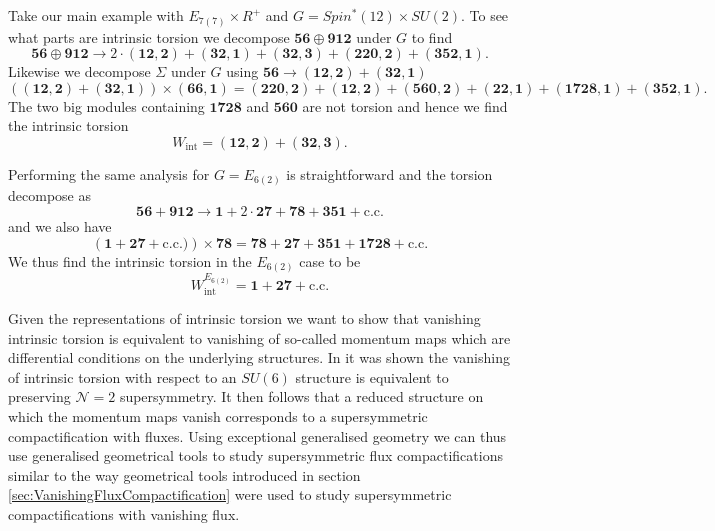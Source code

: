 Take our main example with $E_{7(7)}\times R^+$ and $G=Spin^*(12)\times SU(2)$. To see what parts are intrinsic torsion we decompose $\mathbf{56}\oplus\mathbf{912}$ under $G$ to find 
\begin{equation}
    \mathbf{56}\oplus\mathbf{912} \to 2\cdot (\mathbf{12},\mathbf{2})+(\mathbf{32},\mathbf{1})+(\mathbf{32},\mathbf{3})+(\mathbf{220},\mathbf{2})+(\mathbf{352},\mathbf{1}).
\end{equation}
Likewise we decompose $\Sigma$ under $G$ using $\mathbf{56}\to (\mathbf{12},\mathbf{2})+(\mathbf{32},\mathbf{1})$ 
\begin{equation}
    \left((\mathbf{12},\mathbf{2})+(\mathbf{32},\mathbf{1})\right)\times (\mathbf{66},\mathbf{1})=(\mathbf{220},\mathbf{2})+(\mathbf{12},\mathbf{2})+(\mathbf{560},\mathbf{2})+(\mathbf{22},\mathbf{1})+(\mathbf{1728},\mathbf{1})+(\mathbf{352},\mathbf{1}).
\end{equation}
The two big modules containing $\mathbf{1728}$ and $\mathbf{560}$ are not torsion and hence we find the intrinsic torsion 
\begin{equation}
    W_{\text{int}} = (\mathbf{12},\mathbf{2})+(\mathbf{32},\mathbf{3}).
\end{equation}

Performing the same analysis for $G=E_{6(2)}$ is straightforward and the torsion decompose as
\begin{equation}
    \mathbf{56}+\mathbf{912}\to \mathbf{1}+2\cdot\mathbf{27}+\mathbf{78}+\mathbf{351}+\text{c.c.}
\end{equation}
and we also have 
\begin{equation}
    \left(\mathbf{1}+\mathbf{27}+\text{c.c.})\right)\times \mathbf{78} = \mathbf{78}+\mathbf{27}+\mathbf{351}+\mathbf{1728}+\text{c.c.}
\end{equation}
We thus find the intrinsic torsion in the $E_{6(2)}$ case to be 
\begin{equation}
    W_{\text{int}}^{E_{6(2)}} = \textbf{1}+\mathbf{27}+\text{c.c.}
\end{equation}

Given the representations of intrinsic torsion we want to show that vanishing intrinsic torsion is equivalent to vanishing of so-called momentum maps which are differential conditions on the underlying structures. In \cite{Coimbra:2014uxa} it was shown the vanishing of intrinsic torsion with respect to an $SU(6)$ structure is equivalent to preserving $\mathcal{N}=2$ supersymmetry. It then follows that a reduced structure on which the momentum maps vanish corresponds to a supersymmetric compactification with fluxes. Using exceptional generalised geometry we can thus use generalised geometrical tools to study supersymmetric flux compactifications similar to the way geometrical tools introduced in section \ref{sec:VanishingFluxCompactification} were used to study supersymmetric compactifications with vanishing flux. 

